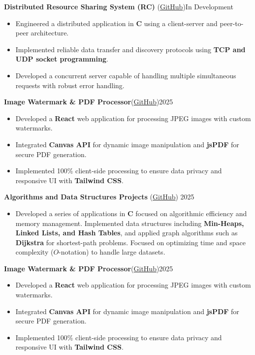 \documentclass[11pt,a4paper]{article}
\begin{document}
\noindent \textbf{Distributed Resource Sharing System (RC)} (\href{https://github.com/CARVALHOCENT/Computer-Networks-and-the-Internet }{GitHub})\hfill In Development 
\begin{itemize}[leftmargin=15pt, label={$\bullet$}, noitemsep, topsep=2pt]
    \item Engineered a distributed application in \textbf{C} using a client-server and peer-to-peer architecture.
    \item Implemented reliable data transfer and discovery protocols using \textbf{TCP and UDP socket programming}.
    \item Developed a concurrent server capable of handling multiple simultaneous requests with robust error handling.
\end{itemize}

\noindent \textbf{Image Watermark \& PDF Processor}(\href{https://github.com/CARVALHOCENT/WatermarkApp }{GitHub})\hfill 2025 
\begin{itemize}[leftmargin=15pt, label={$\bullet$}, noitemsep, topsep=2pt]
    \item Developed a \textbf{React} web application for processing JPEG images with custom watermarks.
    \item Integrated \textbf{Canvas API} for dynamic image manipulation and \textbf{jsPDF} for secure PDF generation.
    \item Implemented 100\% client-side processing to ensure data privacy and responsive UI with \textbf{Tailwind CSS}.
\end{itemize}

\noindent \textbf{Algorithms and Data Structures Projects} (\href{https://github.com/CARVALHOCENT/AED-Projetos}{GitHub}) \hfill 2025 
\begin{itemize}[leftmargin=15pt, label={$\bullet$}]
    \item Developed a series of applications in \textbf{C} focused on algorithmic efficiency and memory management. Implemented data structures including \textbf{Min-Heaps, Linked Lists, and Hash Tables}, and applied graph algorithms such as \textbf{Dijkstra} for shortest-path problems. Focused on optimizing time and space complexity ($O$-notation) to handle large datasets.
\end{itemize}

\noindent \textbf{Image Watermark \& PDF Processor}(\href{https://github.com/CARVALHOCENT/WatermarkApp }{GitHub})\hfill 2025 
\begin{itemize}[leftmargin=15pt, label={$\bullet$}, noitemsep, topsep=2pt]
    \item Developed a \textbf{React} web application for processing JPEG images with custom watermarks.
    \item Integrated \textbf{Canvas API} for dynamic image manipulation and \textbf{jsPDF} for secure PDF generation.
    \item Implemented 100\% client-side processing to ensure data privacy and responsive UI with \textbf{Tailwind CSS}.
\end{itemize}
\end{document}

